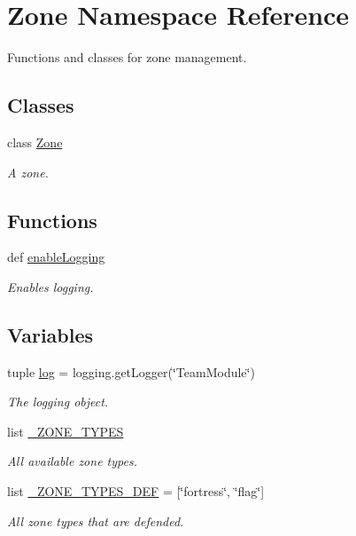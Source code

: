 \hypertarget{namespace_zone}{
\section{\-Zone \-Namespace \-Reference}
\label{namespace_zone}
}


\-Functions and classes for zone management.  


\subsection*{\-Classes}
\begin{DoxyCompactItemize}
\item 
class \hyperlink{class_zone_1_1_zone}{\-Zone}
\begin{DoxyCompactList}\small\item\em \-A zone. \end{DoxyCompactList}\end{DoxyCompactItemize}
\subsection*{\-Functions}
\begin{DoxyCompactItemize}
\item 
def \hyperlink{namespace_zone_a171f19638c4dba22964a5adf6521b148}{enable\-Logging}
\begin{DoxyCompactList}\small\item\em \-Enables logging. \end{DoxyCompactList}\end{DoxyCompactItemize}
\subsection*{\-Variables}
\begin{DoxyCompactItemize}
\item 
tuple \hyperlink{namespace_zone_a612d8a61ed6769d3ea18d7883bcaaae6}{log} = logging.\-get\-Logger(\char`\"{}\-Team\-Module\char`\"{})
\begin{DoxyCompactList}\small\item\em \-The logging object. \end{DoxyCompactList}\item 
list \hyperlink{namespace_zone_ab40d91674ec8149ee703bb799b5fec4c}{\-\_\-\-Z\-O\-N\-E\-\_\-\-T\-Y\-P\-E\-S}
\begin{DoxyCompactList}\small\item\em \-All available zone types. \end{DoxyCompactList}\item 
list \hyperlink{namespace_zone_a97b1d1fa649bef78d253c8398e521c29}{\-\_\-\-Z\-O\-N\-E\-\_\-\-T\-Y\-P\-E\-S\-\_\-\-D\-E\-F} = \mbox{[}\char`\"{}fortress\char`\"{}, \char`\"{}flag\char`\"{}\mbox{]}
\begin{DoxyCompactList}\small\item\em \-All zone types that are defended. \end{DoxyCompactList}\end{DoxyCompactItemize}


